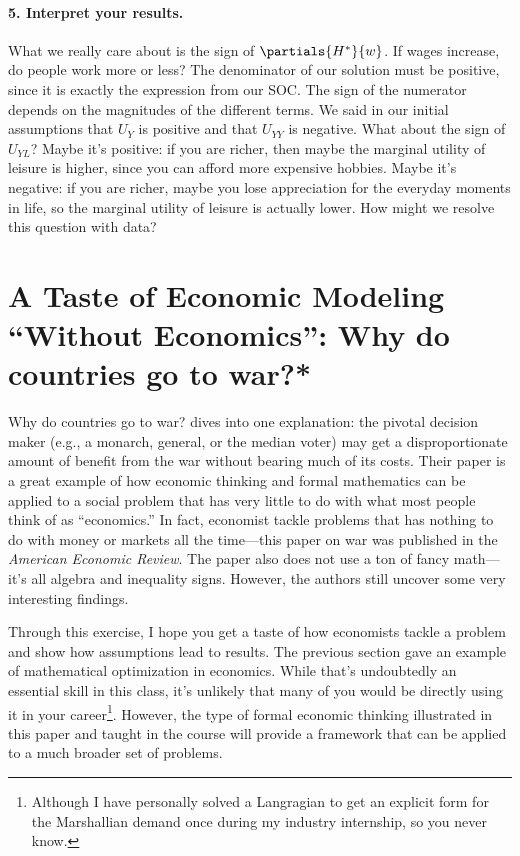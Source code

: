 \paragraph{5. Interpret your results.}

What we really care about is the sign of $\partials{H^*}{w}$. If wages increase, do people work more or less? The denominator of our solution must be positive, since it is exactly the expression from our SOC. The sign of the numerator depends on the magnitudes of the different terms. We said in our initial assumptions that $U_Y$ is positive and that $U_{YY}$ is negative. What about the sign of $U_{YL}$? Maybe it's positive: if you are richer, then maybe the marginal utility of leisure is higher, since you can afford more expensive hobbies. Maybe it's negative: if you are richer, maybe you lose appreciation for the everyday moments in life, so the marginal utility of leisure is actually lower. How might we resolve this question with data?

\section{A Taste of Economic Modeling ``Without Economics'': Why do countries go to war?*}

Why do countries go to war? \citet{war} dives into one explanation: the pivotal decision maker (e.g., a monarch, general, or the median voter) may get a disproportionate amount of benefit from the war without bearing much of its costs. Their paper is a great example of how economic thinking and formal mathematics can be applied to a social problem that has very little to do with what most people think of as ``economics.'' In fact, economist tackle problems that has nothing to do with money or markets all the time---this paper on war was published in the \textit{American Economic Review}. The paper also does not use a ton of fancy math---it's all algebra and inequality signs. However, the authors still uncover some very interesting findings.

Through this exercise, I hope you get a taste of how economists tackle a problem and show how assumptions lead to results. The previous section gave an example of mathematical optimization in economics. While that's undoubtedly an essential skill in this class, it's unlikely that many of you would be directly using it in your career\footnote{Although I have personally solved a Langragian to get an explicit form for the Marshallian demand once during my industry internship, so you never know.}. However, the type of formal economic thinking illustrated in this paper and taught in the course will provide a framework that can be applied to a much broader set of problems.

